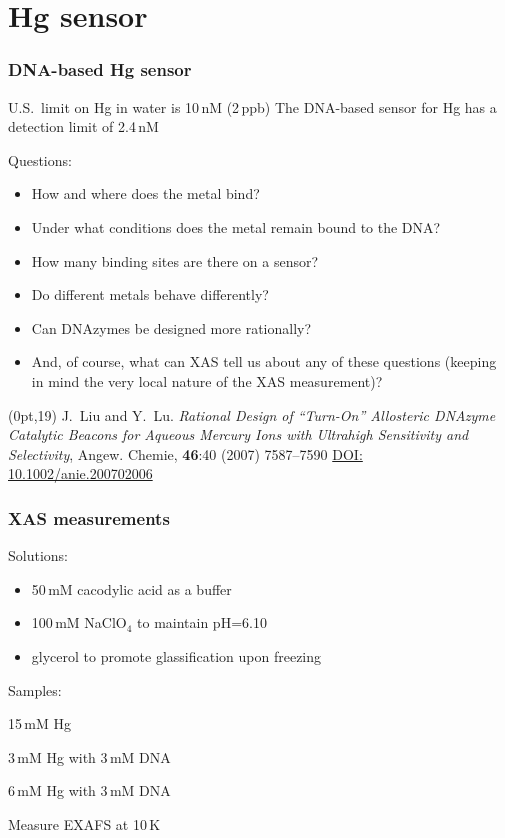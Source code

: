 \documentclass[10pt, xcolor=x11names, compress]{beamer}
\begin{document}
\section{Hg sensor}


\begin{frame}
  \frametitle{DNA-based Hg sensor}
  
  \begin{block}{U.S.\ limit on Hg in water is 10\,nM (2\,ppb)}
    The DNA-based sensor for Hg has a detection limit of 2.4\,nM
  \end{block}

  Questions:
  \begin{itemize}
  \item How and where does the metal bind?
  \item Under what conditions does the metal remain bound to the
    DNA?
  \item How many binding sites are there on a sensor?
  \item Do different metals behave differently?
  \item Can DNAzymes be designed more rationally?
  \item And, of course, what can XAS tell us about any of these
    questions (keeping in mind the very local nature of the XAS
    measurement)?
  \end{itemize}


  \begin{textblock*}{0.7\linewidth}(0pt,19\TPVertModule)%
    \tiny J.\ Liu and Y.\ Lu. \textit{Rational Design of ``Turn-On''
      Allosteric DNAzyme Catalytic Beacons for Aqueous Mercury Ions
      with Ultrahigh Sensitivity and Selectivity}, Angew. Chemie,
    \textbf{46}:40 (2007) 7587--7590
    \href{http://dx.doi.org/10.1002/anie.200702006}{\color{Blue4}DOI:
      10.1002/anie.200702006}
  \end{textblock*}
\end{frame}

\begin{frame}
  \frametitle{XAS measurements}
  Solutions:
  \begin{itemize}
  \item 50\,mM \alert{cacodylic acid} as a buffer
  \item 100\,mM NaClO$_4$ to maintain pH=6.10
  \item glycerol to promote glassification upon freezing
  \end{itemize}

  \bigskip

  Samples:
  \begin{description}[~~~Control]
  \item[~~~Control] 15\,mM Hg
  \item[~~~Sample] 3\,mM Hg with 3\,mM DNA
  \item[~~~Sample with excess Hg] 6\,mM Hg with 3\,mM DNA
  \end{description}

  \bigskip

  \begin{block}{}
    \centering Measure EXAFS at 10\,K
  \end{block}
\end{frame}
\end{document}
